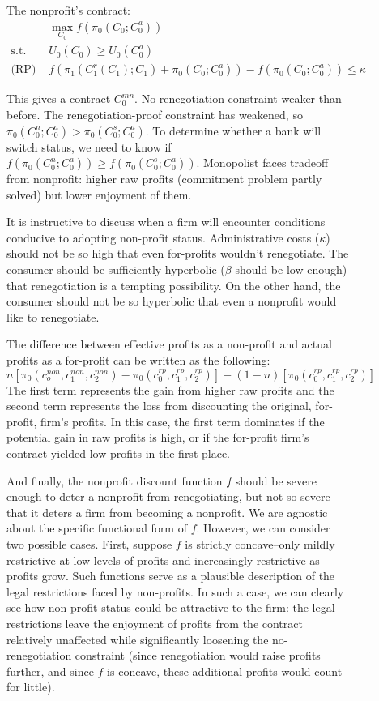 \documentclass[11pt]{article}%
\begin{document}
\begin{figure}
{The nonprofit's contract:%
\begin{align*}
&  \max_{C_{0}}f\left(  \pi_{0}\left(  C_{0};C_{0}^{a}\right)  \right) \\
\text{s.t. (PC) }  &  U_{0}\left(  C_{0}\right)  \geq U_{0}\left(  C_{0}%
^{a}\right) \\
\text{(RP) }  &  f\left(  \pi_{1}\left(  C_{1}^{r}\left(  C_{1}\right)
;C_{1}\right)  +\pi_{0}\left(  C_{0};C_{0}^{a}\right)  \right)  -f\left(
\pi_{0}\left(  C_{0};C_{0}^{a}\right)  \right)  \leq\kappa
\end{align*}


This gives a contract $C_{0}^{mn}$. No-renegotiation constraint weaker than
before. The renegotiation-proof constraint has weakened, so $\pi_{0}\left(
C_{0}^{n};C_{0}^{a}\right)  >\pi_{0}\left(  C_{0}^{s};C_{0}^{a}\right)  $. To
determine whether a bank will switch status, we need to know if $f\left(
\pi_{0}\left(  C_{0}^{n};C_{0}^{a}\right)  \right)  \geq f\left(  \pi
_{0}\left(  C_{0}^{s};C_{0}^{a}\right)  \right)  $. Monopolist faces tradeoff
from nonprofit: higher raw profits (commitment problem partly solved) but
lower enjoyment of them.

It is instructive to discuss when a firm will encounter conditions conducive
to adopting non-profit status. Administrative costs ($\kappa$) should not be
so high that even for-profits wouldn't renegotiate. The consumer should be
sufficiently hyperbolic ($\beta$ should be low enough) that renegotiation is a
tempting possibility. On the other hand, the consumer should not be so
hyperbolic that even a nonprofit would like to renegotiate.

The difference between effective profits as a non-profit and actual profits as
a for-profit can be written as the following:
\[
n\left[  \pi_{0}\left(  c_{o}^{non},c_{1}^{non},c_{2}^{non}\right)  -\pi
_{0}\left(  c_{0}^{rp},c_{1}^{rp},c_{2}^{rp}\right)  \right]  -\left(
1-n\right)  \left[  \pi_{0}\left(  c_{0}^{rp},c_{1}^{rp},c_{2}^{rp}\right)
\right]
\]
The first term represents the gain from higher raw profits and the second term
represents the loss from discounting the original, for-profit, firm's profits.
In this case, the first term dominates if the potential gain in raw profits is
high, or if the for-profit firm's contract yielded low profits in the first place.

And finally, the nonprofit discount function $f$ should be severe enough to
deter a nonprofit from renegotiating, but not so severe that it deters a firm
from becoming a nonprofit. We are agnostic about the specific functional form
of $f$. However, we can consider two possible cases. First, suppose $f$ is
strictly concave--only mildly restrictive at low levels of profits and
increasingly restrictive as profits grow. Such functions serve as a plausible
description of the legal restrictions faced by non-profits. In such a case, we
can clearly see how non-profit status could be attractive to the firm: the
legal restrictions leave the enjoyment of profits from the contract relatively
unaffected while significantly loosening the no-renegotiation constraint
(since renegotiation would raise profits further, and since $f$ is concave,
these additional profits would count for little).

}
\end{figure}
\end{document}
